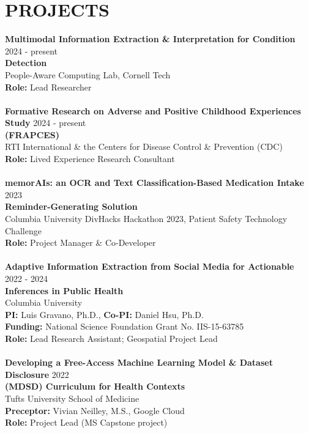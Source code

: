 \documentclass[a4paper,12pt]{article}
\begin{document}
{\section*{PROJECTS}
\textbf{Multimodal Information Extraction \& Interpretation for  Condition} \hfill 2024 - present \\ \textbf{Detection} \\
People-Aware Computing Lab, Cornell Tech \\
\textbf{Role:} Lead Researcher\\
\\
\textbf{Formative Research on Adverse and Positive Childhood Experiences Study} \hfill 2024 - present\\ \textbf{(FRAPCES)}\\
RTI International \& the Centers for Disease Control \& Prevention (CDC)\\
\textbf{Role:} Lived Experience Research Consultant\\
\\
\textbf{memorAIs: an OCR and Text Classification-Based Medication Intake} \hfill 2023 \\ \textbf{Reminder-Generating Solution} \\
Columbia University DivHacks Hackathon 2023, Patient Safety Technology Challenge\\
\textbf{Role:} Project Manager \& Co-Developer\\
\\
\textbf{Adaptive Information Extraction from Social Media for Actionable} \hfill 2022 - 2024 \\ \textbf{Inferences in Public Health} \\
Columbia University\\
\textbf{PI:}  Luis Gravano, Ph.D., \textbf{Co-PI:}  Daniel Hsu, Ph.D.\\
\textbf{Funding:}  National Science Foundation Grant No. IIS-15-63785\\
\textbf{Role:} Lead Research Assistant; Geospatial Project Lead\\
\pagebreak 
\\
\textbf{Developing a Free-Access Machine Learning Model \& Dataset Disclosure} \hfill 2022 \\ \textbf{(MDSD) Curriculum for Health Contexts} \\
Tufts University School of Medicine\\
\textbf{Preceptor:}   Vivian Neilley, M.S., Google Cloud\\
\textbf{Role:} Project Lead (MS Capstone project)\\
}
\end{document}
